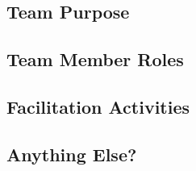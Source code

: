\documentclass[titlepage]{article}
\begin{document}
\subsection{Team Purpose}

\subsection{Team Member Roles}

\subsection{Facilitation Activities}

\subsection{Anything Else?}
\end{document}
